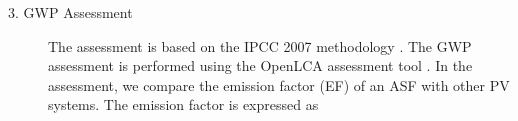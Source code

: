 \begin{description}




\item[3. GWP Assessment] The assessment is based on the IPCC 2007 methodology \cite{solomon2007climate}. The GWP assessment is performed using the OpenLCA assessment tool \cite{ciroth2007ict}. In the assessment, we compare the emission factor (EF) of an ASF with other PV systems. The emission factor is expressed as 


\end{description}
